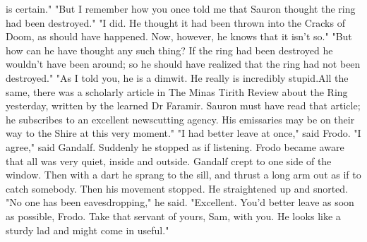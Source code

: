 is certain."
  "But I remember how you once told me that Sauron thought the ring had been
destroyed."
  "I did. He thought it had been thrown into the Cracks of Doom, as should
have happened. Now, however, he knows that it isn't so."
  "But how can he have thought any such thing? If the ring had been
destroyed he wouldn't have been around; so he should have realized that the
ring had not been destroyed."
  "As I told you, he is a dimwit. He really is incredibly stupid.All the
same, there was a scholarly article in The Minas Tirith Review about the
Ring yesterday, written by the learned Dr Faramir. Sauron must have read
that article; he subscribes to an excellent newscutting agency. His
emissaries may be on their way to the Shire at this very moment."
  "I had better leave at once," said Frodo.
  "I agree," said Gandalf. Suddenly he stopped as if listening. Frodo became
aware that all was very quiet, inside and outside. Gandalf crept to one
side of the window. Then with a dart he sprang to the sill, and thrust a
long arm out as if to catch somebody. Then his movement stopped. He
straightened up and snorted.
  "No one has been eavesdropping," he said. "Excellent. You'd better leave
as soon as possible, Frodo. Take that servant of yours, Sam, with you. He
looks like a sturdy lad and might come in useful."
